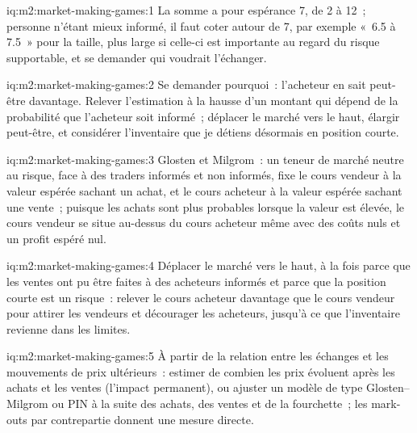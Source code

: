 \begin{solution}{iq:m2:market-making-games:1}
La somme a pour espérance 7, de 2 à 12~; personne n'étant mieux informé, il faut coter autour de 7, par
exemple «~6.5 à 7.5~» pour la taille, plus large si celle-ci est importante au regard du risque
supportable, et se demander qui voudrait l'échanger.
\end{solution}

\begin{solution}{iq:m2:market-making-games:2}
Se demander pourquoi~: l'acheteur en sait peut-être davantage. Relever l'estimation à la hausse d'un montant qui dépend
de la probabilité que l'acheteur soit informé~; déplacer le marché vers le haut, élargir peut-être, et considérer
l'inventaire que je détiens désormais en position courte.
\end{solution}

\begin{solution}{iq:m2:market-making-games:3}
Glosten et Milgrom~: un teneur de marché neutre au risque, face à des traders informés et non informés, fixe le
cours vendeur à la valeur espérée sachant un achat, et le cours acheteur à la valeur espérée sachant une vente~;
puisque les achats sont plus probables lorsque la valeur est élevée, le cours vendeur se situe au-dessus du cours acheteur même avec
des coûts nuls et un profit espéré nul.
\end{solution}

\begin{solution}{iq:m2:market-making-games:4}
Déplacer le marché vers le haut, à la fois parce que les ventes ont pu être faites à des acheteurs informés et parce que
la position courte est un risque~: relever le cours acheteur davantage que le cours vendeur pour attirer les vendeurs et
décourager les acheteurs, jusqu'à ce que l'inventaire revienne dans les limites.
\end{solution}

\begin{solution}{iq:m2:market-making-games:5}
À partir de la relation entre les échanges et les mouvements de prix ultérieurs~: estimer de combien les prix
évoluent après les achats et les ventes (l'impact permanent), ou ajuster un modèle de type Glosten--Milgrom ou PIN
à la suite des achats, des ventes et de la fourchette~; les mark-outs par contrepartie donnent une
mesure directe.
\end{solution}

